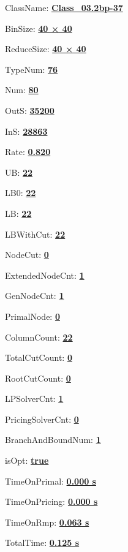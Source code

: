 \documentclass[11pt]{article}
\begin{document}
\pagestyle{empty}


ClassName: \underline{\textbf{Class_03.2bp-37}}
\par
BinSize: \underline{\textbf{40 × 40}}
\par
ReduceSize: \underline{\textbf{40 × 40}}
\par
TypeNum: \underline{\textbf{76}}
\par
Num: \underline{\textbf{80}}
\par
OutS: \underline{\textbf{35200}}
\par
InS: \underline{\textbf{28863}}
\par
Rate: \underline{\textbf{0.820}}
\par
UB: \underline{\textbf{22}}
\par
LB0: \underline{\textbf{22}}
\par
LB: \underline{\textbf{22}}
\par
LBWithCut: \underline{\textbf{22}}
\par
NodeCut: \underline{\textbf{0}}
\par
ExtendedNodeCnt: \underline{\textbf{1}}
\par
GenNodeCnt: \underline{\textbf{1}}
\par
PrimalNode: \underline{\textbf{0}}
\par
ColumnCount: \underline{\textbf{22}}
\par
TotalCutCount: \underline{\textbf{0}}
\par
RootCutCount: \underline{\textbf{0}}
\par
LPSolverCnt: \underline{\textbf{1}}
\par
PricingSolverCnt: \underline{\textbf{0}}
\par
BranchAndBoundNum: \underline{\textbf{1}}
\par
isOpt: \underline{\textbf{true}}
\par
TimeOnPrimal: \underline{\textbf{0.000 s}}
\par
TimeOnPricing: \underline{\textbf{0.000 s}}
\par
TimeOnRmp: \underline{\textbf{0.063 s}}
\par
TotalTime: \underline{\textbf{0.125 s}}
\par
\newpage


\end{document}
